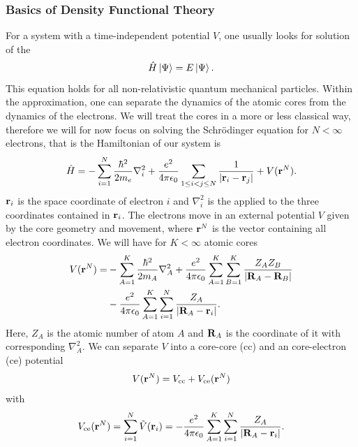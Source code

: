 \documentclass[8.5pt,twoside,twocolumn]{article}
\renewcommand\r{\bo r}
\theoremstyle{standard}
\begin{document}
\subsubsection{Basics of Density Functional Theory}
For a system with a time-independent potential $V$, one usually looks for solution of the 
\begin{equation}
 \hat{H} \left|\Psi{}\right\rangle = E \left|\Psi{}\right\rangle.
 \label{Theo:Schroedinger}
\end{equation}
This equation holds for all non-relativistic quantum mechanical particles. Within the 
approximation, one can separate the dynamics of the atomic cores from the dynamics of the electrons. We will treat
the cores in a more or less classical way, therefore we will for now focus on solving the Schrödinger 
equation for $N < \infty$ electrons, that is the Hamiltonian of our system is
\begin{equation}
 \Ha = -\sum_{i=1}^N \frac{\hbar^2}{2m_e} \nabla_i^2 + \frac {e^2} {4 \pi \e_0} \sum_{1\le i < j \le N} \frac 1 {\abs{\r_i - \r_j}} + V(\r^N).
 \label{Theo:Hamiltonian}
\end{equation}
$\r_i$ is the space coordinate of electron $i$ and $\nabla_i^2$ is the  applied to the three coordinates contained in $\r_i$. 
The electrons move in an external potential $V$ given by the core geometry and movement, where $\r^N$ is the vector containing
all electron coordinates. We will have for $K < \infty$ atomic cores 
\begin{equation}
\begin{aligned}
V(\r^N)=&-\sum_{A=1}^K \frac{\hbar^2}{2m_A} \nabla_A^2 + \frac {e^2} {4 \pi \e_0} \sum_{A=1}^K \sum_{B=1}^K \frac {Z_A Z_B} {\abs{\bo R_A - \bo R_B}} \\
   &- \frac {e^2} {4 \pi \e_0} \sum_{A=1}^K \sum_{i=1}^N \frac {Z_A} {\abs{\bo R_A - \r_i}}. 
\end{aligned}
\label{Theo:CorePotential}
\end{equation}
Here, $Z_A$ is the atomic number of atom $A$ and $\mathbf{R}_A$ is the coordinate of it with corresponding $\nabla_A^2$. We
can separate $V$ into a core-core (cc) and an core-electron (ce) potential
\newcommand\vce{V_{\te{ce}}}
\newcommand\vcc{V_{\te{cc}}}
\begin{equation}
 V(\r^N)=\vcc+\vce(\r^N)
\label{Theo:SeparatePotential}
\end{equation}
with
\begin{equation}
 \vce(\r^N)=\sum_{i=1}^N \tilde V(\r_i) = - \frac {e^2} {4 \pi \e_0} \sum_{A=1}^K \sum_{i=1}^N \frac {Z_A} {\abs{\bo R_A - \r_i}}.
 \label{Theo:CoreElectronPotential}
\end{equation}
\end{document}
